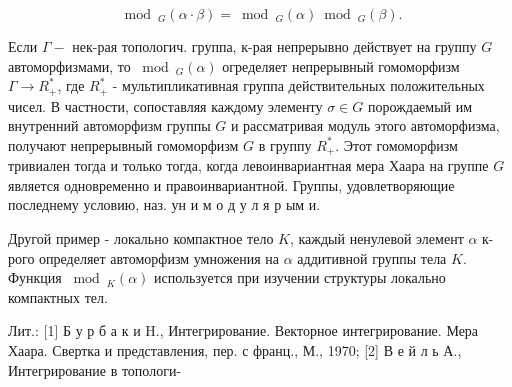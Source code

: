 \documentclass[10pt]{article}
\begin{document}
\[

\bmod _{G}(\alpha \cdot \beta)=\bmod _{G}(\alpha) \bmod _{G}(\beta) .

\]



Если $\Gamma-$ нек-рая топологич. группа, к-рая непрерывно действует на группу $G$ автоморфизмами, то $\bmod _{G}(\alpha)$ огределяет непрерывный гомоморфизм $\Gamma \rightarrow R_{+}^{*}$, где $R_{+}^{*}$ - мультипликативная группа действительных положительных чисел. В частности, сопоставляя каждому элементу $\sigma \in G$ порождаемый им внутренний автоморфизм группы $G$ и рассматривая модуль этого автоморфизма, получают непрерывный гомоморфизм $G$ в группу $R_{+}^{*}$. Этот гомоморфизм тривиален тогда и только тогда, когда левоинвариантная мера Хаара на группе $G$ является одновременно и правоинвариантной. Группы, удовлетворяющие последнему условию, наз. ун и м о д у л я р ым и.



Другой пример - локально компактное тело $K$, каждый ненулевой элемент $\alpha$ к-рого определяет автоморфизм умножения на $\alpha$ аддитивной группы тела $K$. Функция $\bmod _{K}(\alpha)$ используется при изучении структуры локально компактных тел.



Лит.: [1] Б у р б а к и H., Интегрирование. Векторное интегрирование. Мера Хаара. Свертка и представления, пер. с франц., М., 1970; [2] В е й л ь А., Интегрирование в топологи-
\end{document}
